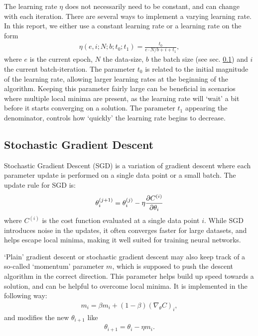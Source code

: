 \documentclass[%
reprint,s
amsmath,amssymb,
aps,
]{revtex4-2}
\begin{document}
The learning rate \(\eta\) does not necessarily need to be constant, and can change with each iteration. There are several ways to implement a varying learning rate. In this report, we either use a constant learning rate or a learning rate on the form 
\begin{align} \label{eq:varyin_learning_rate}
	\eta(e,i;N;b;t_0;t_1) = \frac{t_0}{e\cdot N/b + i + t_1},
\end{align}
where \(e\) is the current epoch, \(N\) the data-size, \(b\) the batch size (see sec. \ref{sec:stochastic_gradient_descent}) and \(i\) the current batch-iteration. The parameter \(t_0\) is related to the initial magnitude of the learning rate, allowing larger learning rates at the beginning of the algorithm. Keeping this parameter fairly large can be beneficial in scenarios where multiple local minima are present, as the learning rate will `wait' a bit before it starts converging on a solution. The parameter \(t_1\) appearing the denominator, controls how  `quickly' the learning rate begins to decrease. 

\subsection{Stochastic Gradient Descent} \label{sec:stochastic_gradient_descent}
Stochastic Gradient Descent (SGD) is a variation of gradient descent where each parameter update is performed on a single data point or a small batch. The update rule for SGD is:
\[
\theta_i^{(j+1)} = \theta_i^{(j)} - \eta \pdv{C^{(i)}}{\theta_i}
\]
where $C^{(i)}$ is the cost function evaluated at a single data point $i$. While SGD introduces noise in the updates, it often converges faster for large datasets, and helps escape local minima, making it well suited for training neural networks.

`Plain' gradient descent or stochastic gradient descent may also keep track of a so-called `momentum' parameter \(m\), which is supposed to push the descent algorithm in the correct direction. This parameter helps build up speed towards a solution, and can be helpful to overcome local minima. It is implemented in the following way:
\begin{align}
	m_i = \beta m_i + (1-\beta)(\nabla_{\theta}C)_i,
\end{align}
and modifies the new \(\theta_{i+1}\) like 
\begin{align}
	\theta_{i+1} = \theta_{i} - \eta m_i.
\end{align}
\end{document}
